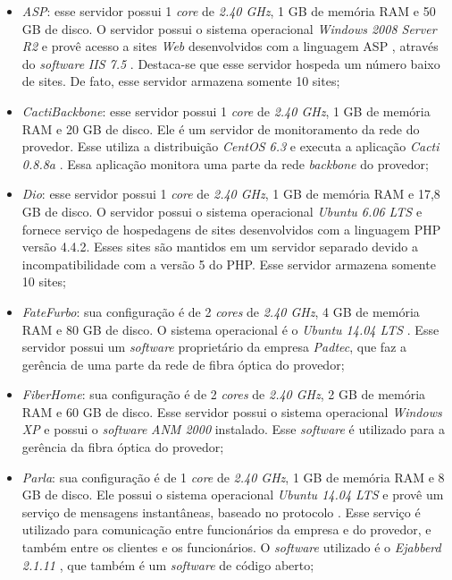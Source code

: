 \begin{itemize}
 \item \textit{ASP}: esse servidor possui 1 \textit{core} de \textit{2.40 GHz}, 1 GB de memória \ac{RAM} e 50 GB de disco. 
 O servidor possui o sistema operacional \textit{Windows 2008 Server R2} e provê acesso a sites \textit{Web} desenvolvidos com a linguagem 
 \ac{ASP} \cite{asp}, através do \textit{software} \textit{\ac{IIS} 7.5} \cite{iis}. Destaca-se que esse servidor hospeda um número baixo de sites.
 De fato, esse servidor armazena somente 10 sites;
 
 \item \textit{CactiBackbone}: esse servidor possui 1 \textit{core} de \textit{2.40 GHz}, 1 GB de memória \ac{RAM} e 20 GB de disco. 
 Ele é um servidor de monitoramento da rede do provedor. Esse utiliza a distribuição \textit{CentOS 6.3} \cite{centos} e executa a aplicação 
 \textit{Cacti 0.8.8a} \cite{cacti}. Essa aplicação monitora uma parte da rede \textit{backbone} do provedor;
 
 \item \textit{Dio}: esse servidor possui 1 \textit{core} de \textit{2.40 GHz}, 1 GB de memória \ac{RAM} e 17,8 GB de disco. 
 O servidor possui o sistema operacional \textit{Ubuntu 6.06 \ac{LTS}} \cite{ubuntu} e fornece serviço de hospedagens de sites desenvolvidos com 
 a linguagem \ac{PHP} versão 4.4.2. Esses sites são mantidos em um servidor separado devido a incompatibilidade com a versão 5 do \ac{PHP}. 
 Esse servidor armazena somente 10 sites;
 
 \item \textit{FateFurbo}: sua configuração é de 2 \textit{cores} de \textit{2.40 GHz}, 4 GB de memória \ac{RAM} e 80 GB de disco. 
 O sistema operacional é o \textit{Ubuntu 14.04 \ac{LTS}} \cite{ubuntu}. Esse servidor possui um \textit{software} proprietário da empresa 
 \textit{Padtec}, que faz a gerência de uma parte da rede de fibra óptica do provedor;
 
 \item \textit{FiberHome}: sua configuração é de 2 \textit{cores} de \textit{2.40 GHz}, 2 GB de memória \ac{RAM} e 60 GB de disco. 
 Esse servidor possui o sistema operacional \textit{Windows XP} e possui o \textit{software} \textit{ANM 2000} instalado. Esse \textit{software} 
 é utilizado para a gerência da fibra óptica do provedor;
 
 \item \textit{Parla}: sua configuração é de 1 \textit{core} de \textit{2.40 GHz}, 1 GB de memória \ac{RAM} e 8 GB de disco. 
 Ele possui o sistema operacional \textit{Ubuntu 14.04 \ac{LTS}} \cite{ubuntu} e provê um serviço de mensagens instantâneas, baseado no protocolo 
  \cite{xmpp}. Esse serviço é utilizado para comunicação entre funcionários da empresa e do provedor, e também entre os clientes e 
 os funcionários. O \textit{software} utilizado é o \textit{Ejabberd 2.1.11} \cite{ejabberd}, que também é um \textit{software} de código aberto;


\end{itemize}
